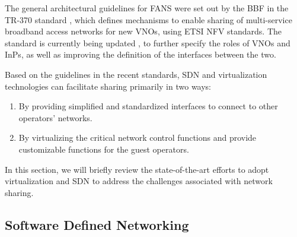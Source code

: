 The general architectural guidelines for \ac{FANS} were set out by the \ac{BBF} in the TR-370 standard \cite{bbf370}, which defines mechanisms to enable sharing of multi-service broadband access networks for new \acp{VNO}, using \ac{ETSI} \ac{NFV} standards. The standard is currently being updated \cite{bbf370i2}, to further specify the roles of \acp{VNO} and \acp{InP}, as well as improving the definition of the interfaces between the two.


Based on the guidelines in the recent standards, \ac{SDN} and virtualization technologies can facilitate sharing primarily in two ways: 
\begin{enumerate}
    \item By providing simplified and standardized interfaces to connect to other operators' networks.
    \item By virtualizing the critical network control functions and provide customizable functions for the guest operators.
\end{enumerate}

In this section, we will briefly review the state-of-the-art efforts to adopt virtualization and \ac{SDN} to address the challenges associated with network sharing.

\subsection{Software Defined Networking}

